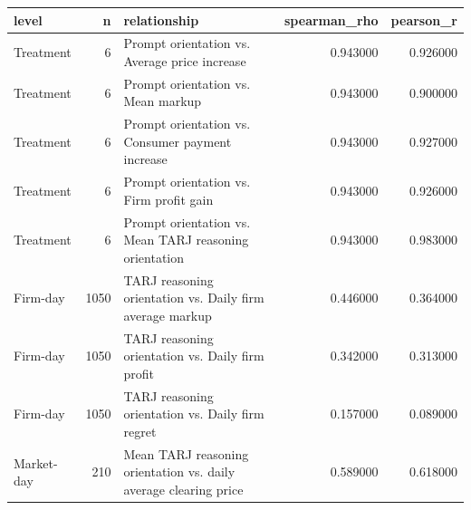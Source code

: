 \begin{tabular}{lrlrr}
\toprule
level & n & relationship & spearman_rho & pearson_r \\
\midrule
Treatment & 6 & Prompt orientation vs. Average price increase & 0.943000 & 0.926000 \\
Treatment & 6 & Prompt orientation vs. Mean markup & 0.943000 & 0.900000 \\
Treatment & 6 & Prompt orientation vs. Consumer payment increase & 0.943000 & 0.927000 \\
Treatment & 6 & Prompt orientation vs. Firm profit gain & 0.943000 & 0.926000 \\
Treatment & 6 & Prompt orientation vs. Mean TARJ reasoning orientation & 0.943000 & 0.983000 \\
Firm-day & 1050 & TARJ reasoning orientation vs. Daily firm average markup & 0.446000 & 0.364000 \\
Firm-day & 1050 & TARJ reasoning orientation vs. Daily firm profit & 0.342000 & 0.313000 \\
Firm-day & 1050 & TARJ reasoning orientation vs. Daily firm regret & 0.157000 & 0.089000 \\
Market-day & 210 & Mean TARJ reasoning orientation vs. daily average clearing price & 0.589000 & 0.618000 \\
\bottomrule
\end{tabular}
